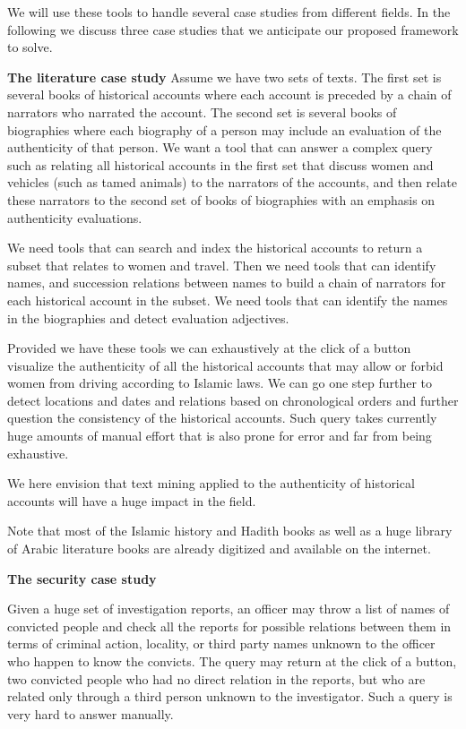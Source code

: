 \documentclass[12pt]{article}
\begin{document}
We will use these tools to handle several case studies from different fields.
 In the following we discuss three case studies that we anticipate our proposed framework to solve.
 
{\bf The literature case study}
Assume we have two sets of texts.
 The first set is several books of historical accounts where each account is preceded by a chain of narrators who narrated the account.
 The second set is several books of biographies where each biography of a person may include an evaluation of the authenticity of that person.
 We want a tool that can answer a complex query such as relating all historical accounts in the first set that discuss women and vehicles (such as tamed animals) to the narrators of the accounts, and then relate these narrators to the second set of books of biographies with an emphasis on authenticity evaluations.

We need tools that can search and index the historical accounts to return a subset that relates to women and travel.
 Then we need tools that can identify names, and succession relations between names to build a chain of narrators for each historical account in the subset.
 We need tools that can identify the names in the biographies and detect evaluation adjectives.
 
Provided we have these tools we can exhaustively at the click of a button visualize the authenticity of all the historical accounts that may allow or forbid women from driving according to Islamic laws.
 We can go one step further to detect locations and dates and relations based on chronological orders and further question the consistency of the historical accounts.
 Such query takes currently huge amounts of manual effort that is also prone for error and far from being exhaustive.
 
We here envision that text mining applied to the authenticity of historical accounts will have a huge impact in the field.

Note that most of the Islamic history and Hadith books as well as a huge library of Arabic literature books are already digitized and available on the internet.

{\bf The security case study}

Given a huge set of investigation reports, an officer may throw a list of names of convicted people and check all the reports for possible relations between them in terms of criminal action, locality, or third party names unknown to the officer who happen to know the convicts.
 The query may return at the click of a button, two convicted people who had no direct relation in the reports, but who are related only through a third person unknown to the investigator.
 Such a query is very hard to answer manually.
\end{document}
